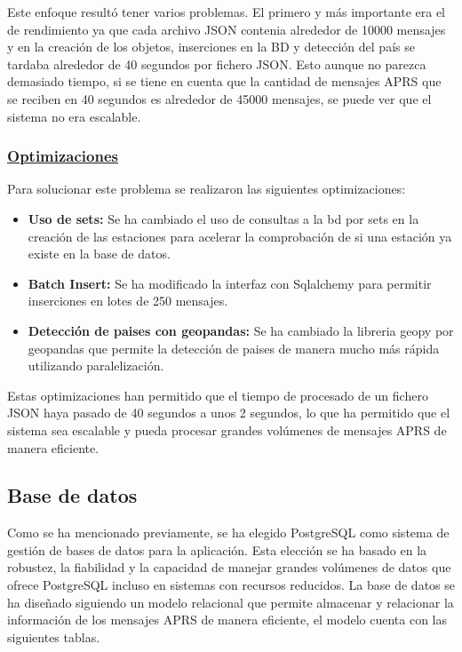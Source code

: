 Este enfoque resultó tener varios problemas. El primero y más importante era el de rendimiento ya que cada archivo JSON contenia alrededor de 10000 mensajes y en la creación de los objetos, inserciones en la BD y detección del país se tardaba alrededor de 40 segundos por fichero JSON. Esto aunque no parezca demasiado tiempo, si se tiene en cuenta que la cantidad de mensajes APRS que se reciben en 40 segundos es alrededor de 45000 mensajes, se puede ver que el sistema no era escalable.

\subsubsection{\underline{Optimizaciones}}
Para solucionar este problema se realizaron las siguientes optimizaciones:
\begin{itemize}
	\item \textbf{Uso de sets:} Se ha cambiado el uso de consultas a la bd por sets en la creación de las estaciones para acelerar la comprobación de si una estación ya existe en la base de datos.
	\item \textbf{Batch Insert:} Se ha modificado la interfaz con Sqlalchemy para permitir inserciones en lotes de 250 mensajes.
	\item \textbf{Detección de paises con geopandas:} Se ha cambiado la libreria geopy por geopandas que permite la detección de paises de manera mucho más rápida utilizando paralelización.
\end{itemize}
Estas optimizaciones han permitido que el tiempo de procesado de un fichero JSON haya pasado de 40 segundos a unos 2 segundos, lo que ha permitido que el sistema sea escalable y pueda procesar grandes volúmenes de mensajes APRS de manera eficiente.

\subsection{Base de datos}
Como se ha mencionado previamente, se ha elegido PostgreSQL como sistema de gestión de bases de datos para la aplicación. Esta elección se ha basado en la robustez, la fiabilidad y la capacidad de manejar grandes volúmenes de datos que ofrece PostgreSQL incluso en sistemas con recursos reducidos. La base de datos se ha diseñado siguiendo un modelo relacional  que permite almacenar y relacionar la información de los mensajes APRS de manera eficiente, el modelo cuenta con las siguientes tablas.


